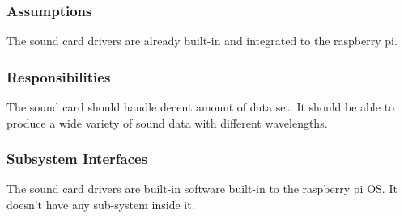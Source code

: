 \subsubsection{Assumptions}
The sound card drivers are already built-in and integrated to the raspberry pi.

\subsubsection{Responsibilities}
The sound card should handle decent amount of data set. It should be able to produce a wide variety of sound data with different wavelengths.

\subsubsection{Subsystem Interfaces}
The sound card drivers are built-in software built-in to the raspberry pi OS. It doesn't have any sub-system inside it.




